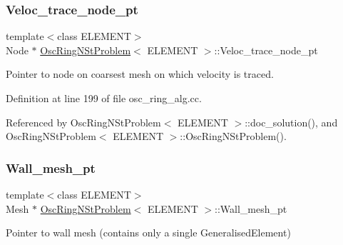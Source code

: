 \mbox{\label{classOscRingNStProblem_aed51269a285ffdc064739d6d363b1179}} 
\subsubsection{\texorpdfstring{Veloc\+\_\+trace\+\_\+node\+\_\+pt}{Veloc\_trace\_node\_pt}}
{\footnotesize\ttfamily template$<$class E\+L\+E\+M\+E\+NT$>$ \\
Node $\ast$ \hyperlink{classOscRingNStProblem}{Osc\+Ring\+N\+St\+Problem}$<$ E\+L\+E\+M\+E\+NT $>$\+::Veloc\+\_\+trace\+\_\+node\+\_\+pt\hspace{0.3cm}{\ttfamily [private]}}



Pointer to node on coarsest mesh on which velocity is traced. 



Definition at line 199 of file osc\+\_\+ring\+\_\+alg.\+cc.



Referenced by Osc\+Ring\+N\+St\+Problem$<$ E\+L\+E\+M\+E\+N\+T $>$\+::doc\+\_\+solution(), and Osc\+Ring\+N\+St\+Problem$<$ E\+L\+E\+M\+E\+N\+T $>$\+::\+Osc\+Ring\+N\+St\+Problem().

\mbox{\label{classOscRingNStProblem_aafee49228dbbee7178448da624b96c3f}} 
\subsubsection{\texorpdfstring{Wall\+\_\+mesh\+\_\+pt}{Wall\_mesh\_pt}}
{\footnotesize\ttfamily template$<$class E\+L\+E\+M\+E\+NT$>$ \\
Mesh $\ast$ \hyperlink{classOscRingNStProblem}{Osc\+Ring\+N\+St\+Problem}$<$ E\+L\+E\+M\+E\+NT $>$\+::Wall\+\_\+mesh\+\_\+pt\hspace{0.3cm}{\ttfamily [private]}}



Pointer to wall mesh (contains only a single Generalised\+Element) 



